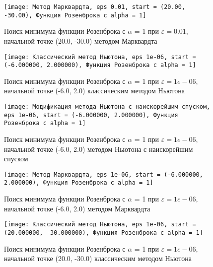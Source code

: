             \begin{figure}[H]
	        \centering
	        \texttt{[image: Метод Марквардта, eps 0.01, start = (20.00, -30.00), Функция Розенброка с alpha = 1]}%
	        \caption{Поиск минимума функции Розенброка с $\alpha$ = 1 при $\varepsilon = 0.01$, начальной точке (20.0, -30.0) методом Марквардта}
	        \vspace*{-1.2cm}
            \end{figure}
            
            \begin{figure}[H]
	        \centering
	        \texttt{[image: Классический метод Ньютона, eps 1e-06, start = (-6.000000, 2.000000), Функция Розенброка с alpha = 1]}%
	        \caption{Поиск минимума функции Розенброка с $\alpha$ = 1 при $\varepsilon = 1e-06$, начальной точке (-6.0, 2.0) классическим методом Ньютона}
	        \vspace*{-1.2cm}
            \end{figure}
            
            \begin{figure}[H]
	        \centering
	        \texttt{[image: Модификация метода Ньютона с наискорейшим спуском, eps 1e-06, start = (-6.000000, 2.000000), Функция Розенброка с alpha = 1]}%
	        \caption{Поиск минимума функции Розенброка с $\alpha$ = 1 при $\varepsilon = 1e-06$, начальной точке (-6.0, 2.0) методом Ньютона с наискорейшим спуском}
	        \vspace*{-1.2cm}
            \end{figure}
            
            \begin{figure}[H]
	        \centering
	        \texttt{[image: Метод Марквардта, eps 1e-06, start = (-6.000000, 2.000000), Функция Розенброка с alpha = 1]}%
	        \caption{Поиск минимума функции Розенброка с $\alpha$ = 1 при $\varepsilon = 1e-06$, начальной точке (-6.0, 2.0) методом Марквардта}
	        \vspace*{-1.2cm}
            \end{figure}
            
            \begin{figure}[H]
	        \centering
	        \texttt{[image: Классический метод Ньютона, eps 1e-06, start = (20.000000, -30.000000), Функция Розенброка с alpha = 1]}%
	        \caption{Поиск минимума функции Розенброка с $\alpha$ = 1 при $\varepsilon = 1e-06$, начальной точке (20.0, -30.0) классическим методом Ньютона}
	        \vspace*{-1.2cm}
            \end{figure}
            
